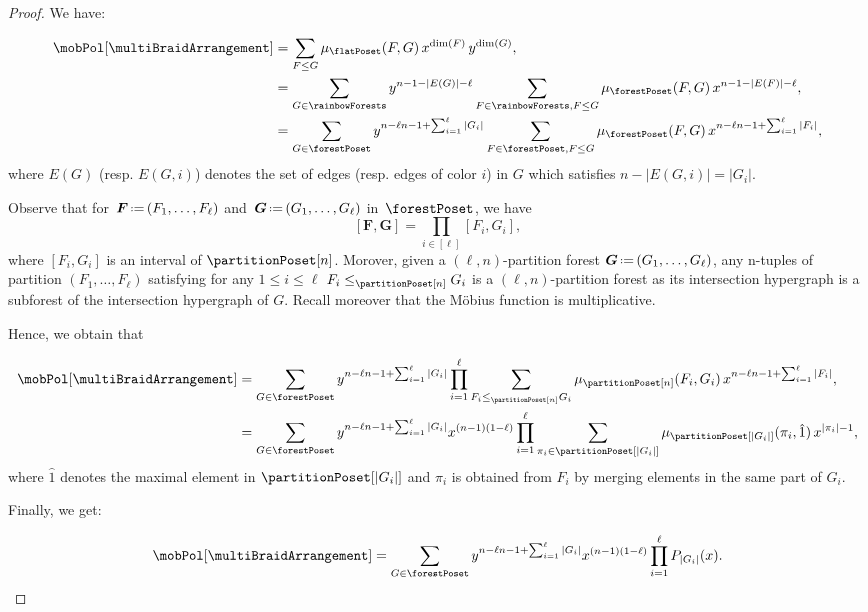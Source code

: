 \documentclass{amsart}
\theoremstyle{definition}
\renewcommand{\b}[1]{{\boldsymbol{#1}}} %
\newcommand{\eqdef}{\mbox{\,\raisebox{0.2ex}{\scriptsize\ensuremath{\mathrm:}}\ensuremath{=}\,}} %
\renewcommand{\b}[1]{\boldsymbol{#1}} %
\begin{document}
\begin{proof}
We have:

\begin{align*}
\mobPol[\multiBraidArrangement] & =\sum_{F \leq G} \mu_{\flatPoset}(F,G) \, x^{\dim(F)} \, y^{\dim(G)}, \\
 &=\sum_{G \in \rainbowForests} y^{n-1 - |E(G)| - \ell} \sum_{F \in \rainbowForests, F \leq G } \mu_{\forestPoset}(F,G) \, x^{n-1 - |E(F)| - \ell}, \\
 &=\sum_{G \in \forestPoset} y^{n-\ell n - 1 + \sum_{i=1}^\ell |G_i|} \sum_{F \in \forestPoset, F \leq G } \mu_{\forestPoset}(F,G) \, x^{n-\ell n - 1 + \sum_{i=1}^\ell |F_i|}, \\ 
\end{align*}
where $E(G)$ (resp. $E(G,i)$) denotes the set of edges (resp. edges of color $i$) in $G$ which satisfies $n-|E(G,i)| =  |G_i|$.

Observe that for~$\b{F} \eqdef (F_1, \dots, F_\ell)$ and~$\b{G} \eqdef (G_1, \dots, G_\ell)$ in~$\forestPoset$, we have
\[
[\b{F}, \b{G}] = \prod_{i \in [\ell]} [F_i, G_i],
\]
where $[F_i, G_i]$ is an interval of $\partitionPoset[n]$. Morover, given a $(\ell,n)$-partition forest $\b{G}\eqdef (G_1, \dots, G_\ell)$, any n-tuples of partition $(F_1, \dots, F_\ell)$ satisfying for any $1\leq i \leq \ell$ $F_i \leq_{\partitionPoset[n]} G_i $ is a $(\ell,n)$-partition forest as its intersection hypergraph is a subforest of the intersection hypergraph of $G$. 
Recall moreover that the M\"obius function is multiplicative.


Hence, we obtain that

\begin{align*}
\mobPol[\multiBraidArrangement] &=\sum_{G \in \forestPoset} y^{n-\ell n - 1 + \sum_{i=1}^\ell |G_i|} \prod_{i=1}^{\ell} \sum_{F_i \leq_{\partitionPoset[n]} G_i } \mu_{\partitionPoset[n]}(F_i,G_i) \, x^{n-\ell n - 1 + \sum_{i=1}^\ell |F_i|}, \\
 &=\sum_{G \in \forestPoset} y^{n-\ell n - 1 + \sum_{i=1}^\ell |G_i|} x^{(n-1)(1-\ell)} \prod_{i=1}^{\ell} \sum_{\pi_i \in \partitionPoset[|G_i|]}  \mu_{\partitionPoset[|G_i|]}(\pi_i,\hat{1}) \, x^{|\pi_i|-1}, 
\end{align*}
where $\hat{1}$ denotes the maximal element in $\partitionPoset[|G_i|]$ and $\pi_i$ is obtained from $F_i$ by merging elements in the same part of $G_i$.

Finally, we get:

\begin{equation}
\mobPol[\multiBraidArrangement]=\sum_{G \in \forestPoset} y^{n-\ell n - 1 + \sum_{i=1}^\ell |G_i|} x^{(n-1)(1-\ell)} \prod_{i=1}^{\ell} P_{|G_i|}(x).
\end{equation}
\end{proof}
\end{document}
